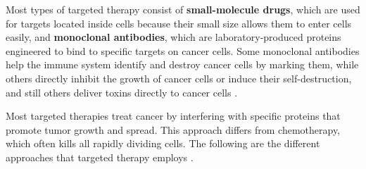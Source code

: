 Most types of targeted therapy consist of \textbf{small-molecule drugs}, which are used for targets located inside cells because their small size allows them to enter cells easily, and \textbf{monoclonal antibodies}, which are laboratory-produced proteins engineered to bind to specific targets on cancer cells. Some monoclonal antibodies help the immune system identify and destroy cancer cells by marking them, while others directly inhibit the growth of cancer cells or induce their self-destruction, and still others deliver toxins directly to cancer cells \cite{target_therapy1}.

Most targeted therapies treat cancer by interfering with specific proteins that promote tumor growth and spread. This approach differs from chemotherapy, which often kills all rapidly dividing cells. The following are the different approaches that targeted therapy employs \cite{target_therapy1}.

